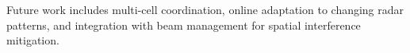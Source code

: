 \documentclass[conference]{IEEEtran}
\begin{document}
Future work includes multi-cell coordination, online adaptation to changing radar patterns, and integration with beam management for spatial interference mitigation.



\end{document}
